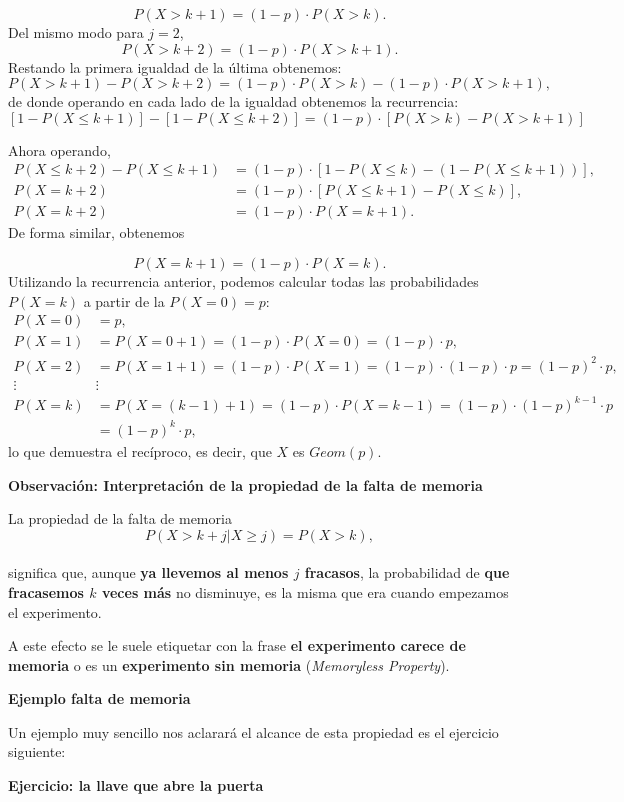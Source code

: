 \documentclass[]{book}
\begin{document}
\[
P(X>k+1)=(1-p)\cdot P(X>k).
\]
Del mismo modo para \(j=2\),
\[
P(X>k+2)=(1-p)\cdot P(X>k+1).
\]
Restando la primera igualdad de la última obtenemos:
\[
P(X>k+1)-P(X>k+2)=(1-p)\cdot P(X>k)-(1-p)\cdot P(X>k+1),
\]
de donde operando en cada lado de la igualdad obtenemos la recurrencia:
\[
[1-P(X\leq k+1)]-[1-P(X\leq k+2)]=(1-p)\cdot [P(X>k)-P(X>k+1)]
\]

Ahora operando,
\[
\begin{array}{rl}
P(X\leq k+2)-P(X\leq k+1) & =(1-p)\cdot[1-P(X\leq k)-\left(1-P(X\leq k+1)\right)],\\
P(X=k+2) & =(1-p)\cdot[P(X\leq k+1)-P(X\leq k)], \\
P(X=k+2) & =(1-p)\cdot P(X=k+1).
\end{array}
\]
De forma similar, obtenemos

\[
P(X=k+1)=(1-p)\cdot P(X=k).
\]
Utilizando la recurrencia anterior, podemos calcular todas las probabilidades \(P(X=k)\) a partir de la \(P(X=0)=p\):
\[
\begin{array}{rl}
P(X=0)&= p,\\
P(X=1)&=P(X=0+1)= (1-p)\cdot P(X=0) =(1-p)\cdot  p,\\
P(X=2)&=P(X=1+1)= (1-p)\cdot P(X=1)=(1-p)\cdot (1-p)\cdot p=(1-p)^2\cdot p,\\
 \vdots& \vdots \\
P(X=k)&=P(X=(k-1)+1)= (1-p)\cdot P(X=k-1)=(1-p)\cdot (1-p)^{k-1}\cdot p \\
& =(1-p)^{k}\cdot p,
\end{array}
\]
lo que demuestra el recíproco, es decir, que \(X\) es \(Geom(p)\).

\textbf{Observación: Interpretación de la propiedad de la falta de memoria}

La propiedad de la falta de memoria
\[
P(X> k+j\big|X \geq j)=P(X > k),
\]\\
significa que, aunque \textbf{ya llevemos al menos \(j\) fracasos}, la probabilidad de \textbf{que fracasemos \(k\) veces más} no disminuye, es la misma que era cuando empezamos el experimento.

A este efecto se le suele etiquetar con la frase \textbf{el experimento carece de memoria} o es un \textbf{experimento sin memoria} (\emph{Memoryless Property}).

\textbf{Ejemplo falta de memoria}

Un ejemplo muy sencillo nos aclarará el alcance de esta propiedad es el ejercicio siguiente:

\textbf{Ejercicio: la llave que abre la puerta}
\end{document}
